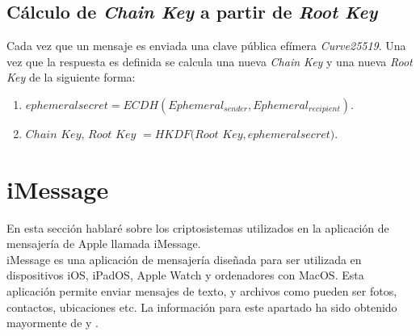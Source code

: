 \subsection{Cálculo de \emph{Chain Key} a partir de \emph{Root Key}}
Cada vez que un mensaje es enviada una clave pública efímera \emph{Curve25519}. Una vez que la respuesta es definida se calcula una nueva \emph{Chain Key} y una nueva \emph{Root Key} de la siguiente forma:
\begin{enumerate}
	\item $ephemeral$\textunderscore $secret = ECDH(Ephemeral_{sender}, Ephemeral_{recipient})$.
	\item $Chain$ $Key$, $Root$ $Key$ $= HKDF(Root$ $Key, ephemeral$\textunderscore$secret)$.
\end{enumerate}

\section{iMessage}
En esta sección hablaré sobre los criptosistemas utilizados en la aplicación de mensajería de Apple llamada iMessage.\\
iMessage es una aplicación de mensajería diseñada para ser utilizada en dispositivos iOS, iPadOS, Apple Watch y ordenadores con MacOS. Esta aplicación permite enviar mensajes de texto, y archivos como pueden ser fotos, contactos, ubicaciones etc. La información para este apartado ha sido obtenido mayormente de \cite{apple2} y \cite{apple1}.\\

